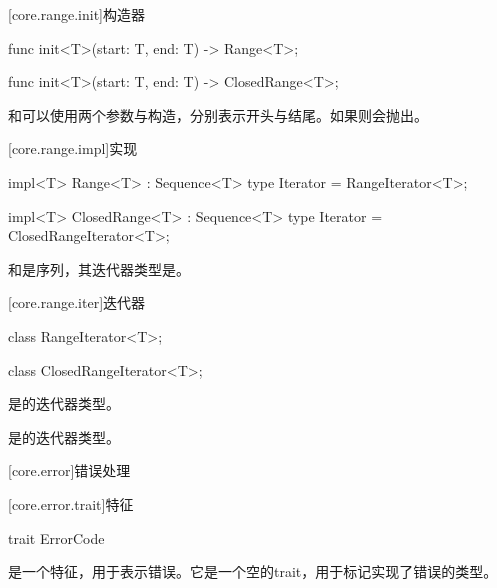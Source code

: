 [core.range.init]{构造器}

\begin{itemdecl}
func init<T>(start: T, end: T) -> Range<T>;
\end{itemdecl}

\begin{itemdecl}
func init<T>(start: T, end: T) -> ClosedRange<T>;
\end{itemdecl}

\pnum
{}和可以使用两个参数与构造，分别表示开头与结尾。如果则会抛出。

[core.range.impl]{实现}

\begin{itemdecl}
impl<T> Range<T> : Sequence<T> {
    type Iterator = RangeIterator<T>;
}
\end{itemdecl}

\begin{itemdecl}
impl<T> ClosedRange<T> : Sequence<T> {
    type Iterator = ClosedRangeIterator<T>;
}
\end{itemdecl}

\pnum
{}和是序列，其迭代器类型是。

[core.range.iter]{迭代器}

\begin{itemdecl}
class RangeIterator<T>;
\end{itemdecl}

\begin{itemdecl}
class ClosedRangeIterator<T>;
\end{itemdecl}

\pnum
{}是的迭代器类型。

\pnum
{}是的迭代器类型。

[core.error]{错误处理}

[core.error.trait]{特征}

\begin{itemdecl}
trait ErrorCode { }
\end{itemdecl}

\pnum
{}是一个特征，用于表示错误。它是一个空的trait，用于标记实现了错误的类型。

